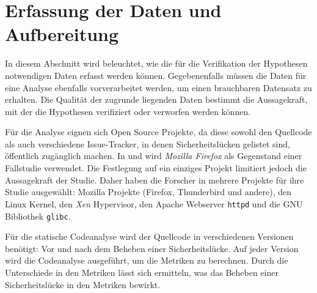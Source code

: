 \section{Erfassung der Daten und Aufbereitung}
\label{sec:erfassung}
In diesem Abschnitt wird beleuchtet, wie die für die Verifikation der Hypothesen notwendigen Daten erfasst werden können.
Gegebenenfalls müssen die Daten für eine Analyse ebenfalls vorverarbeitet werden, um einen brauchbaren Datensatz zu erhalten.
Die Qualität der zugrunde liegenden Daten bestimmt die Aussagekraft, mit der die Hypothesen verifiziert oder verworfen werden können.

Für die Analyse eignen sich Open Source Projekte,
da diese sowohl den Quellcode als auch verschiedene Issue-Tracker,
in denen Sicherheitslücken gelistet sind,
öffentlich zugänglich machen.
In \cite{chowdhury_zulkernine_2010} und \cite{chowdhury_zulkernine_2009} wird \emph{Mozilla Firefox} als Gegenstand einer Fallstudie verwendet.
Die Festlegung auf ein einziges Projekt limitiert jedoch die Aussagekraft der Studie.
Daher haben die Forscher in \cite{alves_et_al} mehrere Projekte für ihre Studie ausgewählt: 
Mozilla Projekte (Firefox, Thunderbird und andere),
den Linux Kernel,
den \emph{Xen} Hypervisor,
den Apache Webserver \texttt{httpd} und
die GNU Bibliothek \texttt{glibc}.

Für die statische Codeanalyse wird der Quellcode in verschiedenen Versionen benötigt: Vor und nach dem Beheben einer Sicherheitslücke.
Auf jeder Version wird die Codeanalyse ausgeführt, um die Metriken zu berechnen.
Durch die Unterschiede in den Metriken lässt sich ermitteln, was das Beheben einer Sicherheitslücke in den Metriken bewirkt.

